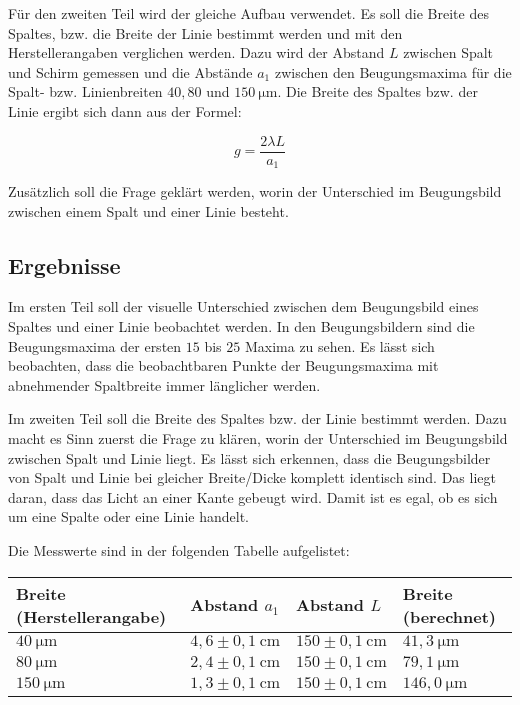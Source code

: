         Für den zweiten Teil wird der gleiche Aufbau verwendet. Es soll die Breite des Spaltes, bzw. die Breite der Linie bestimmt werden und mit den Herstellerangaben verglichen werden. Dazu wird der Abstand $L$ zwischen Spalt und Schirm gemessen und die Abstände $a_{1}$ zwischen den Beugungsmaxima für die Spalt- bzw. Linienbreiten $40, 80$ und $150\ \mathrm{\mu m}$. Die Breite des Spaltes bzw. der Linie ergibt sich dann aus der Formel:

        $$g = \frac{2 \lambda L}{a_{1}}$$

        Zusätzlich soll die Frage geklärt werden, worin der Unterschied im Beugungsbild zwischen einem Spalt und einer Linie besteht.
    
    \subsection{Ergebnisse}

        Im ersten Teil soll der visuelle Unterschied zwischen dem Beugungsbild eines Spaltes und einer Linie beobachtet werden. In den Beugungsbildern sind die Beugungsmaxima der ersten $15$ bis $25$ Maxima zu sehen. Es lässt sich beobachten, dass die beobachtbaren Punkte der Beugungsmaxima mit abnehmender Spaltbreite immer länglicher werden. 

        Im zweiten Teil soll die Breite des Spaltes bzw. der Linie bestimmt werden. Dazu macht es Sinn zuerst die Frage zu klären, worin der Unterschied im Beugungsbild zwischen Spalt und Linie liegt. Es lässt sich erkennen, dass die Beugungsbilder von Spalt und Linie bei gleicher Breite/Dicke komplett identisch sind. Das liegt daran, dass das Licht an einer Kante gebeugt wird. Damit ist es egal, ob es sich um eine Spalte oder eine Linie handelt.
        
        Die Messwerte sind in der folgenden Tabelle aufgelistet:

        \begin{table}[H]
            \centering
            \begin{tabular}{|l|l|l|l|}
                \hline
                Breite (Herstellerangabe) & Abstand $a_{1}$ & Abstand $L$ & Breite (berechnet)\\
                \hline
                $40\ \mathrm{\mu m}$ & $4,6 \pm 0,1\ \mathrm{cm}$ & $150 \pm 0,1\ \mathrm{cm}$ & $41,3\ \mathrm{\mu m}$\\
                \hline
                $80\ \mathrm{\mu m}$ & $2,4 \pm 0,1\ \mathrm{cm}$ & $150 \pm 0,1\ \mathrm{cm}$ & $79,1\ \mathrm{\mu m}$\\
                \hline
                $150\ \mathrm{\mu m}$ & $1,3 \pm 0,1\ \mathrm{cm}$ & $150 \pm 0,1\ \mathrm{cm}$ & $146,0\ \mathrm{\mu m}$\\
                \hline
            \end{tabular}
        \end{table}

